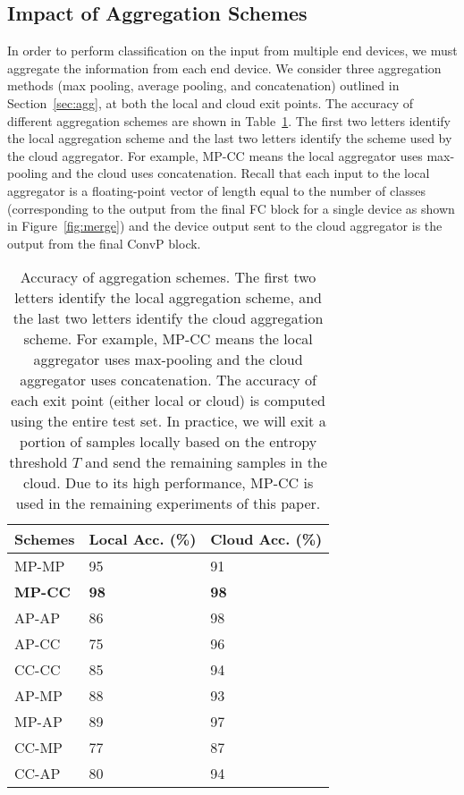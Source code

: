 \documentclass[10pt, conference, compsocconf]{IEEEtran}
\begin{document}
\subsection{Impact of Aggregation Schemes}
\label{sec:agganalysis}
In order to perform classification on the input from multiple end devices, we must aggregate the information from each end device. We consider three aggregation methods (max pooling, average pooling, and concatenation) outlined in Section~\ref{sec:agg}, at both the local and cloud exit points. The accuracy of different aggregation schemes are shown in Table~\ref{tab:aggregate_schemes}. The first two letters identify the local aggregation scheme and the last two letters identify the scheme used by the cloud aggregator. For example, MP-CC means the local aggregator uses max-pooling and the cloud uses concatenation. Recall that each input to the local aggregator is a floating-point vector of length equal to the number of classes (corresponding to the output from the final FC block for a single device as shown in Figure~\ref{fig:merge}) and the device output sent to the cloud aggregator is the output from the final ConvP block.

\begin{table}[t]
\centering
\caption{Accuracy of aggregation schemes. The first two letters identify the local aggregation scheme, and the last two letters identify the cloud aggregation scheme. For example, MP-CC means the local aggregator uses max-pooling and the cloud aggregator uses concatenation. The accuracy of each exit point (either local or cloud) is computed using the entire test set. In practice, we will exit a portion of samples locally based on the entropy threshold $T$ and send the remaining samples in the cloud. Due to its high performance, MP-CC is used in the remaining experiments of this paper.}
\label{tab:aggregate_schemes}
\begin{tabular}{|l|l|l|}
\hline
\textbf{Schemes} & \textbf{Local Acc. (\%)} & \textbf{Cloud Acc. (\%)}   \\
\hline
MP-MP   & 95           &	91                              \\
\textbf{MP-CC}  & \textbf{98}  &	\textbf{98}                     \\
AP-AP   & 86           &	98                              \\
AP-CC   & 75           &	96                              \\
CC-CC   & 85           &	94                              \\
AP-MP   & 88           &	93                              \\
MP-AP   & 89           &	97                              \\
CC-MP   & 77           &	87                              \\
CC-AP   & 80           &	94                              \\
\hline
\end{tabular}
\end{table}
\end{document}

